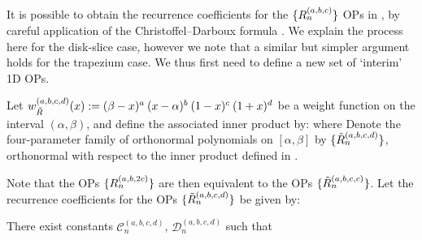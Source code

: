 It is possible to obtain the recurrence coefficients for the $\{R_n^{(a,b,c)}\}$ OPs in , by careful application of the Christoffel--Darboux formula \cite[(18.2.12)]{DLMF}. We explain the process here for the disk-slice case, however we note that a similar but simpler argument holds for the trapezium case. We thus first need to define a new set of `interim' 1D OPs.
\begin{definition}\label{def:ds:InterimOPconstruction}
Let $w_{\tilde{R}}^{(a,b,c,d)}(x) := (\beta - x)^a \: (x - \alpha)^{b} \: (1-x)^{c} \: (1+x)^{d} $ be a weight function on the interval $(\alpha, \beta)$, and define the associated inner product by:
where
Denote the four-parameter family of orthonormal polynomials on $[\alpha,\beta]$ by $\{\tilde{R}_n^{(a,b,c,d)}\}$, orthonormal with respect to the inner product defined in .
\end{definition}
Note that the OPs $\{R_n^{(a,b,2c)}\}$ are then equivalent to the OPs $\{\tilde{R}_n^{(a,b,c,c)}\}$. Let the recurrence coefficients for the OPs $\{\tilde{R}_n^{(a,b,c,d)}\}$ be given by:
\begin{proposition}
There exist constants $\mathcal{C}_n^{(a,b,c,d)}$, $\mathcal{D}_n^{(a,b,c,d)}$ such that
\end{proposition}

